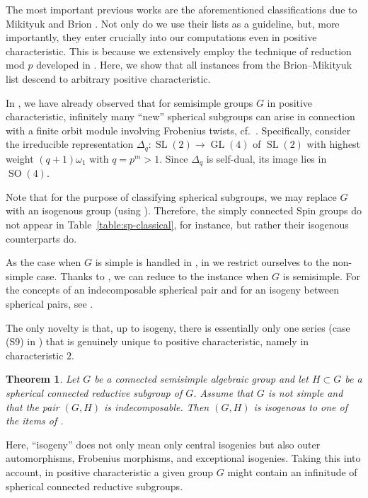 \documentclass[12pt]{amsart}
\newcommand\GL{\operatorname{GL}}
\newcommand\SL{\operatorname{SL}}
\newcommand\SOO{\operatorname{SO}}
\numberwithin{equation}{section}
\newtheorem{theorem}[theorem]{Theorem}
\theoremstyle{definition}
\begin{document}
The most important previous works are the aforementioned
classifications due to Mikityuk \cite[\S 5]{mik} and Brion
\cite{Bri87}.  Not only do we use their lists as a guideline, but, more
importantly, they enter crucially into our computations even in positive
characteristic.  This is because we extensively employ the technique
of reduction mod $p$ developed in \cite{KR}.  Here, we show that all
instances from the Brion--Mikityuk list descend to arbitrary positive
characteristic.

In \cite{KR}, we have already observed that for semisimple groups $G$
in positive characteristic, infinitely many ``new'' spherical subgroups
can arise in connection with a finite orbit module involving Frobenius
twists, cf.~\cite[Lem.\ 2.6]{GLMS}.  Specifically, consider the
irreducible representation $\Delta_q:\SL(2)\to\GL(4)$ of $\SL(2)$ with
highest weight $(q+1)\omega_1$ with $q=p^m>1$.  Since $\Delta_q$ is
self-dual, its image lies in $\SOO(4)$.

Note that for the purpose of classifying spherical subgroups, we may
replace $G$ with an isogenous group (using
). Therefore, the simply connected Spin groups do
not appear in Table~\ref{table:sp-classical}, for
instance, but rather their isogenous counterparts do.

As the case when $G$ is simple is handled in \cite{KR}, in  we restrict ourselves to the non-simple case. Thanks to , we can reduce to the instance when $G$ is semisimple. For the concepts of an indecomposable spherical pair and for an isogeny between spherical pairs, see .

The only novelty is that, up to
isogeny, there is essentially only one series (case (S9) in
) that is genuinely unique to positive
characteristic, namely in characteristic $2$.

\begin{theorem}
  \label{thm:main}
  Let $G$ be a connected semisimple algebraic group and let
  $H \subset G$ be a spherical connected reductive subgroup of
  $G$. Assume that $G$ is not simple and that the pair $(G,H)$ is
  indecomposable. Then $(G,H)$ is isogenous to one of the items of
  .
\end{theorem}

Here, ``isogeny'' does not only mean only central isogenies but also outer automorphisms, Frobenius morphisms, and exceptional
isogenies. Taking this into account, in positive characteristic a
given group $G$ might contain an infinitude of spherical connected
reductive subgroups.
\end{document}

